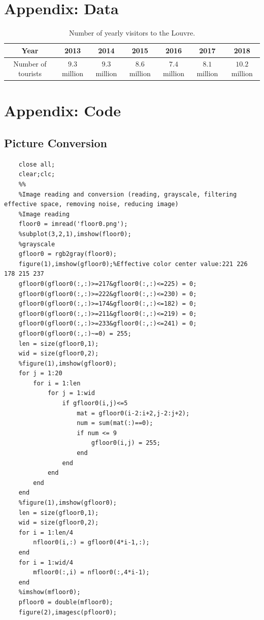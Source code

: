 \begin{appendices}
\section{Appendix: Data}

    \begin{table}[ht]
    \centering
    \begin{tabular}{c|cccccc}
    \toprule
    Year&2013&2014&2015&2016&2017&2018\\
    \midrule
    Number of tourists&$9.3$million&$9.3$million&$8.6$million&$7.4$million&$8.1$million&$10.2$million\\
    \bottomrule
    \end{tabular}
    \caption{Number of yearly visitors to the Louvre.}
    \end{table}
    
\section{Appendix: Code}
      
\subsection{Picture Conversion}      
\lstset{language=Matlab}
        
\begin{lstlisting}
    close all;
    clear;clc;
    %%
    %Image reading and conversion (reading, grayscale, filtering effective space, removing noise, reducing image)
    %Image reading
    floor0 = imread('floor0.png');
    %subplot(3,2,1),imshow(floor0);
    %grayscale
    gfloor0 = rgb2gray(floor0);
    figure(1),imshow(gfloor0);%Effective color center value:221 226 178 215 237
    gfloor0(gfloor0(:,:)>=217&gfloor0(:,:)<=225) = 0;
    gfloor0(gfloor0(:,:)>=222&gfloor0(:,:)<=230) = 0;
    gfloor0(gfloor0(:,:)>=174&gfloor0(:,:)<=182) = 0;
    gfloor0(gfloor0(:,:)>=211&gfloor0(:,:)<=219) = 0;
    gfloor0(gfloor0(:,:)>=233&gfloor0(:,:)<=241) = 0;
    gfloor0(gfloor0(:,:)~=0) = 255;
    len = size(gfloor0,1);
    wid = size(gfloor0,2);
    %figure(1),imshow(gfloor0);
    for j = 1:20
        for i = 1:len
            for j = 1:wid
                if gfloor0(i,j)<=5
                    mat = gfloor0(i-2:i+2,j-2:j+2);
                    num = sum(mat(:)==0);
                    if num <= 9
                        gfloor0(i,j) = 255;
                    end        
                end
            end
        end
    end 
    %figure(1),imshow(gfloor0);
    len = size(gfloor0,1);
    wid = size(gfloor0,2);
    for i = 1:len/4
        nfloor0(i,:) = gfloor0(4*i-1,:);
    end
    for i = 1:wid/4
        mfloor0(:,i) = nfloor0(:,4*i-1);
    end
    %imshow(mfloor0);
    pfloor0 = double(mfloor0); 
    figure(2),imagesc(pfloor0);
\end{lstlisting}


\end{appendices}
